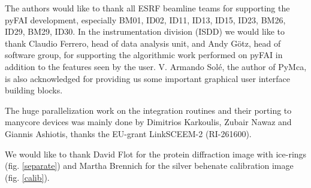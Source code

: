 \documentclass[preprint]{iucr}
\begin{document}

The authors would like to thank all ESRF beamline teams for supporting the
pyFAI development, especially BM01, ID02, ID11, ID13, ID15, ID23, BM26, ID29, BM29,
ID30. In the instrumentation division (ISDD) we would like to thank Claudio
Ferrero, head of data analysis unit, and Andy G\"otz, head of software group, for
supporting the algorithmic work performed on pyFAI in addition to the features
seen by the user.
V. Armando Solé, the author of PyMca, is also acknowledged for providing us some
important graphical user interface building blocks.

The huge parallelization work on the integration routines and their porting to
manycore devices was mainly done by Dimitrios Karkoulis, Zubair Nawaz and
Giannis Ashiotis, thanks the EU-grant LinkSCEEM-2 (RI-261600).

We would like to thank David Flot for the protein
diffraction image with ice-rings (fig. \ref{separate}) and Martha Brennich for
the silver behenate calibration image (fig. \ref{calib}).
\end{document}
